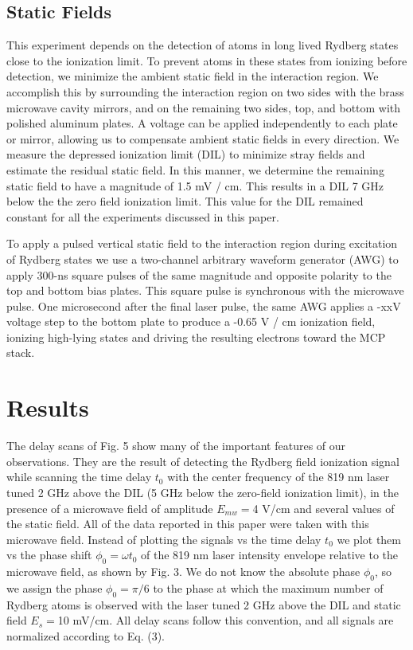 \documentclass[aps,pra,preprint,groupedaddress]{revtex4-1}
\begin{document}
\subsection{\label{fields} Static Fields}

This experiment depends on the detection of atoms in long lived Rydberg states close to the ionization limit. To prevent atoms in these states from ionizing before detection, we minimize the ambient static field in the interaction region. We accomplish this by surrounding the interaction region on two sides with the brass microwave cavity mirrors, and on the remaining two sides, top, and bottom with polished aluminum plates. A voltage can be applied independently to each plate or mirror, allowing us to compensate ambient static fields in every direction. We measure the depressed ionization limit (DIL) to minimize stray fields and estimate the residual static field. In this manner, we determine the remaining static field to have a magnitude of 1.5 mV / cm. This results in a DIL 7 GHz below the the zero field ionization limit. This value for the DIL remained constant for all the experiments discussed in this paper.

To apply a pulsed vertical static field to the interaction region during excitation of Rydberg states we use a two-channel arbitrary waveform generator (AWG) to apply 300-ns square pulses of the same magnitude and opposite polarity to the top and bottom bias plates. This square pulse is synchronous with the microwave pulse. One microsecond after the final laser pulse, the same AWG applies a -xxV voltage step to the bottom plate to produce a -0.65 V / cm ionization field, ionizing high-lying states and driving the resulting electrons toward the MCP stack.

\section{\label{results} Results}



The delay scans of Fig. 5 show many of the important features of our observations. They are the result of detecting the Rydberg field ionization signal while scanning the time delay $t_0$ with the center frequency of the 819 nm laser tuned 2 GHz above the DIL (5 GHz below the zero-field ionization limit), in the presence of a microwave field of amplitude $E_{mw}=$4 V/cm and several values of the static field. All of the data reported in this paper were taken with this microwave field. Instead of plotting the signals vs the time delay $t_0$ we plot them vs the phase shift $\phi_0=\omega t_0$ of the 819 nm laser intensity envelope relative to the microwave field, as shown by Fig. 3. We do not know the absolute phase $\phi_0$, so we assign the phase $\phi_0=\pi/6$ to the phase at which the maximum number of Rydberg atoms is observed with the laser tuned 2 GHz above the DIL and static field $E_s=$10 mV/cm. All delay scans follow this convention, and all signals are normalized according to Eq. (3).
\end{document}
